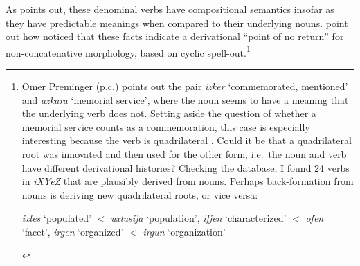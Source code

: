\begin{exe}
\begin{xlist}
\begin{exe}
\begin{xlist}
\begin{exe}
\begin{exe}
\begin{xlist}
\begin{exe}
\begin{exe}
\begin{xlist}
\begin{exe}
\begin{xlist}
\begin{exe}
\begin{xlist}
\begin{exe}
\begin{xlist}
\begin{xlist}
\begin{exe}
\begin{xlist}
\begin{exe}
\begin{xlist}
\begin{exe}
\begin{exe}
\begin{exe}
\begin{xlist}
\begin{exe}
\begin{exe}
\begin{xlist}
\begin{exe}
\begin{xlist}
\begin{exe}
\begin{xlist}
\begin{exe}
\begin{xlist}
\begin{xlist}
\begin{exe}
\begin{xlist}
\begin{exe}
\begin{xlist}
\begin{exe}
\begin{xlist}
\begin{exe}
\begin{xlist}
\begin{exe}
\begin{exe}
\begin{exe}
\begin{exe}
\begin{exe}
\begin{xlist}
\begin{xlist}
\begin{exe}
\begin{xlist}
\begin{exe}
\begin{xlist}
\begin{exe}
\begin{exe}
\begin{exe}
\begin{xlist}
\begin{exe}
\begin{xlist}
\begin{exe}
\begin{xlist}
\begin{exe}
\begin{exe}
\begin{xlist}
\begin{exe}
\begin{exe}
\begin{exe}
\begin{xlist}
\begin{xlist}
\begin{exe}
\begin{exe}
\begin{exe}
\begin{xlist}
\begin{exe}
\begin{xlist}
\begin{exe}
\begin{xlist}
As \cite{arad03} points out, these denominal verbs have compositional semantics insofar as they have predictable meanings when compared to their underlying nouns. \cite{kastnertucker19cup} point out how \citeauthor{arad03} noticed that these facts indicate a derivational ``point of no return'' for non-concatenative morphology, based on cyclic spell-out.\footnote{Omer Preminger (p.c.) points out the pair \emph{izker} `commemorated, mentioned' and \emph{azkara} `memorial service', where the noun seems to have a meaning that the underlying verb does not. Setting aside the question of whether a memorial service counts as a commemoration, this case is especially interesting because the verb is quadrilateral \citep{schwarzwald16}. Could it be that a quadrilateral root  was innovated and then used for the other form, i.e.~the noun and verb have different derivational histories? Checking the database, I found 24 verbs in \emph{iXYeZ} that are plausibly derived from nouns. Perhaps back-formation from nouns is deriving new quadrilateral roots, or vice versa:
 \begin{exe}
 \ex  
 \begin{xlist} 
 	\ex  \emph{ixles} `populated' $<$ \emph{uxlusija} `population', \emph{ifjen} `characterized' $<$ \emph{ofen} `facet', \emph{irgen} `organized' $<$ \emph{irgun} `organization' 

\end{xlist}
\end{exe}}
\end{xlist}
\end{exe}
\end{xlist}
\end{exe}
\end{xlist}
\end{exe}
\end{exe}
\end{exe}
\end{xlist}
\end{xlist}
\end{exe}
\end{exe}
\end{exe}
\end{xlist}
\end{exe}
\end{exe}
\end{xlist}
\end{exe}
\end{xlist}
\end{exe}
\end{xlist}
\end{exe}
\end{exe}
\end{exe}
\end{xlist}
\end{exe}
\end{xlist}
\end{exe}
\end{xlist}
\end{xlist}
\end{exe}
\end{exe}
\end{exe}
\end{exe}
\end{exe}
\end{xlist}
\end{exe}
\end{xlist}
\end{exe}
\end{xlist}
\end{exe}
\end{xlist}
\end{exe}
\end{xlist}
\end{xlist}
\end{exe}
\end{xlist}
\end{exe}
\end{xlist}
\end{exe}
\end{xlist}
\end{exe}
\end{exe}
\end{xlist}
\end{exe}
\end{exe}
\end{exe}
\end{xlist}
\end{exe}
\end{xlist}
\end{exe}
\end{xlist}
\end{xlist}
\end{exe}
\end{xlist}
\end{exe}
\end{xlist}
\end{exe}
\end{xlist}
\end{exe}
\end{exe}
\end{xlist}
\end{exe}
\end{exe}
\end{xlist}
\end{exe}
\end{xlist}
\end{exe}
